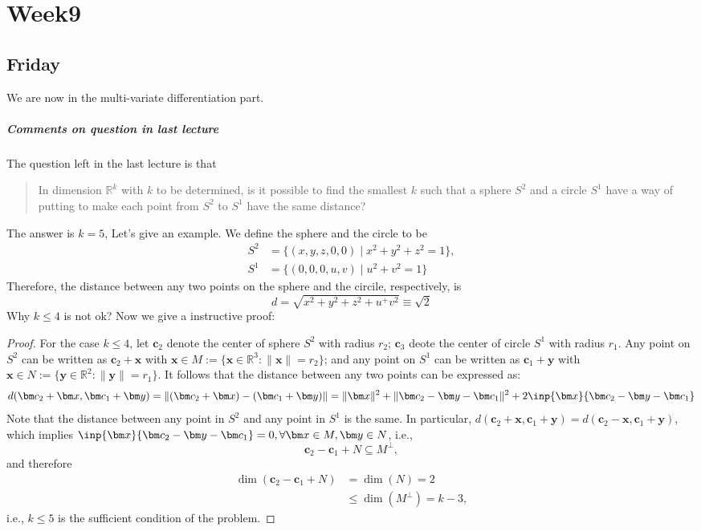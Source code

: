 \chapter{Week9}
\section{Friday}
We are now in the multi-variate differentiation part. 
\paragraph{Comments on question in last lecture}
The question left in the last lecture is that
\begin{quotation}
In dimension $\mathbb{R}^k$ with $k$ to be determined, is it possible to find the smallest $k$ such that a sphere $S^2$ and a circle $S^1$ have a way of putting to make each point from $S^2$ to $S^1$ have the same distance?
\end{quotation}
The answer is $k=5$, Let's give an example. We define the sphere and the circle to be 
\[
\begin{aligned}
S^2&=\{(x,y,z,0,0)\mid x^2+y^2+z^2=1\},\\
S^1&=\{(0,0,0,u,v)\mid u^2+v^2=1\}
\end{aligned}
\]
Therefore, the distance between any two points on the sphere and the circile, respectively, is
\[
d=\sqrt{x^2+y^2+z^2+u^+v^2}\equiv\sqrt{2}
\]
Why $k\le 4$ is not ok? Now we give a instructive proof:
\begin{proof}
For the case $k\le4$, let $\bm c_2$ denote the center of sphere $S^2$ with radius $r_2$; $\bm c_3$ deote the center of circle $S^1$ with radius $r_1$. Any point on $S^2$ can be written as $\bm c_2+\bm x$ with $\bm x\in M:=\{\bm x\in\mathbb{R}^3:\|\bm x\|=r_2\}$; and any point on $S^1$ can be written as $\bm c_1+\bm y$ with $\bm x\in N:=\{\bm y\in\mathbb{R}^2:\|\bm y\|=r_1\}$. It follows that the distance between any two points can be expressed as:
\[
d(\bm c_2+\bm x,\bm c_1+\bm y)=
\|(\bm c_2+\bm x) - (\bm c_1+\bm y)\|
=
\|\bm x\|^2+\|\bm c_2-\bm y-\bm c_1\|^2+2\inp{\bm x}{\bm c_2-\bm y-\bm c_1}
\]
Note that the distance between any point in $S^2$ and any point in $S^1$ is the same. In particular, $d(\bm c_2+\bm x,\bm c_1+\bm y)=d(\bm c_2-\bm x,\bm c_1+\bm y)$, which implies $\inp{\bm x}{\bm c_2-\bm y-\bm c_1}=0,\forall\bm x\in M,\bm y\in N$, i.e., 
\[
\bm c_2-\bm c_1+N\subseteq M^\perp,
\]
and therefore
\begin{align*}
\dim(\bm c_2-\bm c_1+N)&=\dim(N)=2\\
&\le\dim(M^\perp)=k-3,
\end{align*}
i.e., $k\le 5$ is the sufficient condition of the problem.

\end{proof}


